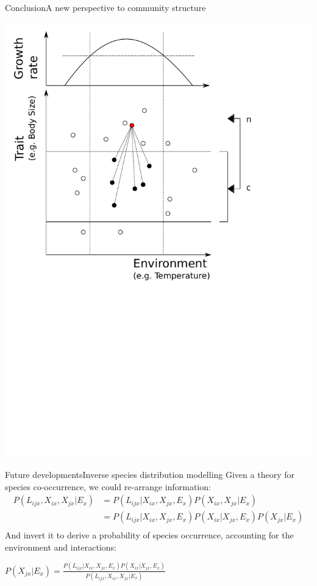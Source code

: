 \documentclass{eecslides}
\begin{document}
	\begin{frame}{Conclusion}{A new perspective to community structure}
		\begin{center}
		\includegraphics[height=1.2\textheight]{integrated_niche}\\
		\end{center}
	\end{frame}


	\begin{frame}{Future developments}{Inverse species distribution modelling}
	Given a theory for species co-occurrence, we could re-arrange information:\\
		\begin{align*}
			P(L_{ijx},X_{ix},X_{jx}|E_x) &= P(L_{ijx}|X_{ix},X_{jx},E_x)P(X_{ix},X_{jx}|E_x)\\
			&= P(L_{ijx}|X_{ix},X_{jx},E_x)P(X_{ix}|X_{jx},E_x)P(X_{jx}|E_x)\\
		\end{align*}
	And invert it to derive a probability of species occurrence, accounting for the environment and interactions: 		    
		\begin{center}
			$P(X_{jx}|E_x)=\frac{P(L_{ijx}|X_{ix},X_{jx},E_x)P(X_{ix}|X_{jx},E_x)}{P(L_{ijx},X_{ix},X_{jx}|E_x)}$
		\end{center}
	\end{frame}
\end{document}
